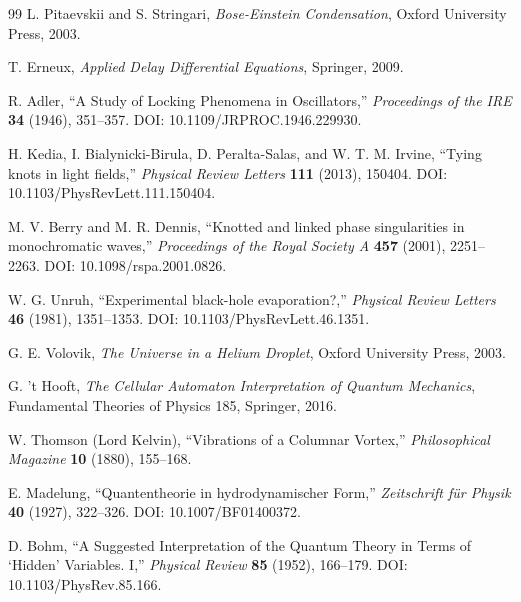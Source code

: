 \documentclass[11pt,a4paper]{article}
\begin{document}
\begin{thebibliography}{99}
        L. Pitaevskii and S. Stringari,
        \textit{Bose-Einstein Condensation},
        Oxford University Press, 2003.
        
        T. Erneux,
        \textit{Applied Delay Differential Equations},
        Springer, 2009.
        
        R. Adler,
        ``A Study of Locking Phenomena in Oscillators,''
        \textit{Proceedings of the IRE} \textbf{34} (1946), 351--357.
        DOI: 10.1109/JRPROC.1946.229930.
        
        H. Kedia, I. Bialynicki-Birula, D. Peralta-Salas, and W. T. M. Irvine,
        ``Tying knots in light fields,''
        \textit{Physical Review Letters} \textbf{111} (2013), 150404.
        DOI: 10.1103/PhysRevLett.111.150404.
        
        M. V. Berry and M. R. Dennis,
        ``Knotted and linked phase singularities in monochromatic waves,''
        \textit{Proceedings of the Royal Society A} \textbf{457} (2001), 2251--2263.
        DOI: 10.1098/rspa.2001.0826.
        
        W. G. Unruh,
        ``Experimental black-hole evaporation?,''
        \textit{Physical Review Letters} \textbf{46} (1981), 1351--1353.
        DOI: 10.1103/PhysRevLett.46.1351.
        
        G. E. Volovik,
        \textit{The Universe in a Helium Droplet},
        Oxford University Press, 2003.
        
        G. 't Hooft,
        \textit{The Cellular Automaton Interpretation of Quantum Mechanics},
        Fundamental Theories of Physics 185, Springer, 2016.
        
        W. Thomson (Lord Kelvin),
        ``Vibrations of a Columnar Vortex,''
        \textit{Philosophical Magazine} \textbf{10} (1880), 155--168.
        
        E. Madelung,
        ``Quantentheorie in hydrodynamischer Form,''
        \textit{Zeitschrift für Physik} \textbf{40} (1927), 322--326.
        DOI: 10.1007/BF01400372.
        
        D. Bohm,
        ``A Suggested Interpretation of the Quantum Theory in Terms of `Hidden' Variables. I,''
        \textit{Physical Review} \textbf{85} (1952), 166--179.
        DOI: 10.1103/PhysRev.85.166.
        

\end{thebibliography}
\end{document}
